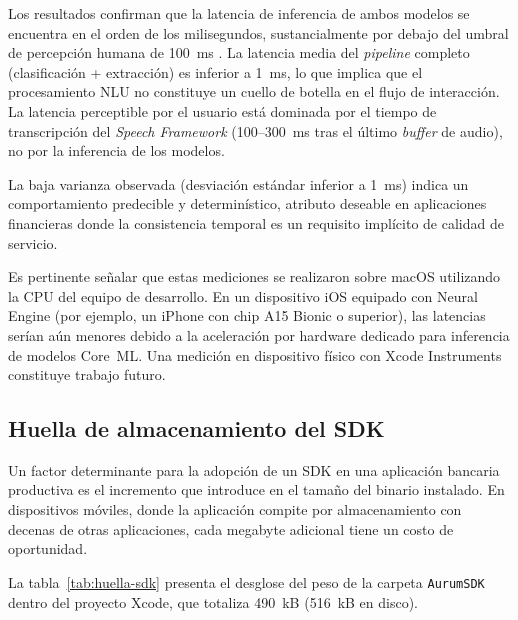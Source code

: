 Los resultados confirman que la latencia de inferencia de ambos modelos se encuentra en el orden de los milisegundos, sustancialmente por debajo del umbral de percepción humana de 100~ms \citep{nielsen-response-times}. La latencia media del \textit{pipeline} completo (clasificación + extracción) es inferior a 1~ms, lo que implica que el procesamiento NLU no constituye un cuello de botella en el flujo de interacción. La latencia perceptible por el usuario está dominada por el tiempo de transcripción del \textit{Speech Framework} (100--300~ms tras el último \textit{buffer} de audio), no por la inferencia de los modelos.

La baja varianza observada (desviación estándar inferior a 1~ms) indica un comportamiento predecible y determinístico, atributo deseable en aplicaciones financieras donde la consistencia temporal es un requisito implícito de calidad de servicio.

Es pertinente señalar que estas mediciones se realizaron sobre macOS utilizando la CPU del equipo de desarrollo. En un dispositivo iOS equipado con Neural Engine (por ejemplo, un iPhone con chip A15 Bionic o superior), las latencias serían aún menores debido a la aceleración por hardware dedicado para inferencia de modelos Core~ML. Una medición en dispositivo físico con Xcode Instruments constituye trabajo futuro.

\subsection{Huella de almacenamiento del SDK}
\label{subsec:huella-sdk}

Un factor determinante para la adopción de un SDK en una aplicación bancaria productiva es el incremento que introduce en el tamaño del binario instalado. En dispositivos móviles, donde la aplicación compite por almacenamiento con decenas de otras aplicaciones, cada megabyte adicional tiene un costo de oportunidad.

La tabla~\ref{tab:huella-sdk} presenta el desglose del peso de la carpeta \texttt{AurumSDK} dentro del proyecto Xcode, que totaliza 490~kB (516~kB en disco).

